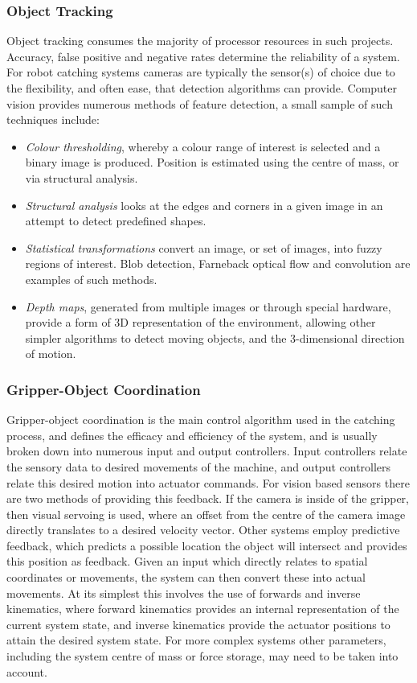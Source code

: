 \documentclass[conference]{IEEEtran}
\begin{document}
\subsubsection{Object Tracking}
Object tracking consumes the majority of processor resources in such projects. Accuracy, false positive and negative rates determine the reliability of a system. For robot catching systems cameras are typically the sensor(s) of choice due to the flexibility, and often ease, that detection algorithms can provide. Computer vision provides numerous methods of feature detection, a small sample of such techniques include:
\begin{itemize}
\item \textit{Colour thresholding}, whereby a colour range of interest is selected and a binary image is produced. Position is estimated using the centre of mass, or via structural analysis.
\item \textit{Structural analysis} looks at the edges and corners in a given image in an attempt to detect predefined shapes.
\item \textit{Statistical transformations} convert an image, or set of images, into fuzzy regions of interest. Blob detection, Farneback optical flow and convolution are examples of such methods.
\item \textit{Depth maps}, generated from multiple images or through special hardware, provide a form of 3D representation of the environment, allowing other simpler algorithms to detect moving objects, and the 3-dimensional direction of motion.
\end{itemize}
\subsubsection{Gripper-Object Coordination}
Gripper-object coordination is the main control algorithm used in the catching process, and defines the efficacy and efficiency of the system, and is usually broken down into numerous input and output controllers. Input controllers relate the sensory data to desired movements of the machine, and output controllers relate this desired motion into actuator commands.
For vision based sensors there are two methods of providing this feedback. If the camera is inside of the gripper, then visual servoing is used, where an offset from the centre of the camera image directly translates to a desired velocity vector. Other systems employ predictive feedback, which predicts a possible location the object will intersect and provides this position as feedback.
Given an input which directly relates to spatial coordinates or movements, the system can then convert these into actual movements. At its simplest this involves the use of forwards and inverse kinematics, where forward kinematics provides an internal representation of the current system state, and inverse kinematics provide the actuator positions to attain the desired system state. For more complex systems other parameters, including the system centre of mass or force storage, may need to be taken into account. 
\end{document}
